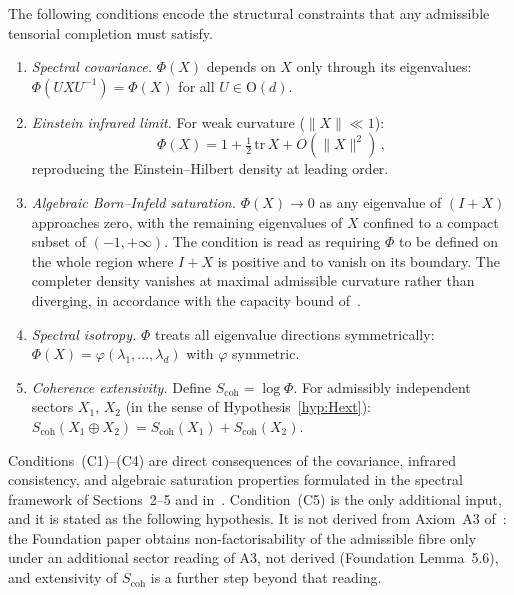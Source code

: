 \documentclass[pdflatex,sn-mathphys-num]{sn-jnl} %
\theoremstyle{remark}
\theoremstyle{plain}
\begin{document}
    The following conditions encode the structural constraints
    that any admissible tensorial completion must satisfy.

    \begin{enumerate}
      \item[\textbf{(C1)}]
      \textit{Spectral covariance.}\;
      $\Phi(X)$ depends on $X$ only through its eigenvalues:
      $\Phi(U X U^{-1}) = \Phi(X)$ for all
      $U \in \mathrm{O}(d)$.

      \item[\textbf{(C2)}]
      \textit{Einstein infrared limit.}\;
      For weak curvature ($\|X\| \ll 1$):
      \[
        \Phi(X)
        = 1 + \tfrac{1}{2}\,\mathrm{tr}\, X
        + O(\|X\|^2)\,,
      \]
      reproducing the Einstein--Hilbert density at
      leading order.

      \item[\textbf{(C3)}]
      \textit{Algebraic Born--Infeld saturation.}\;
      $\Phi(X) \to 0$ as any eigenvalue of $(I + X)$
      approaches zero, with the remaining eigenvalues of $X$
      confined to a compact subset of $(-1,+\infty)$.
      The condition is read as requiring $\Phi$ to be defined on the whole region where $I + X$ is positive and to
      vanish on its boundary.
      The completer density vanishes at maximal admissible
      curvature rather than diverging, in accordance with
      the capacity bound
      of~\cite{Beau2026c}.

      \item[\textbf{(C4)}]
      \textit{Spectral isotropy.}\;
      $\Phi$ treats all eigenvalue directions symmetrically:
      $\Phi(X) = \varphi(\lambda_1, \ldots, \lambda_d)$
      with $\varphi$ symmetric.

      \item[\textbf{(C5)}]
      \textit{Coherence extensivity.}\;
      Define $S_{\mathrm{coh}} = \log \Phi$.
      For admissibly independent sectors $X_1$, $X_2$
      (in the sense of Hypothesis~\ref{hyp:Hext}):
      $S_{\mathrm{coh}}(X_1 \oplus X_2)
      = S_{\mathrm{coh}}(X_1)
      + S_{\mathrm{coh}}(X_2)$.
    \end{enumerate}

    Conditions~(C1)--(C4) are direct consequences of the
    covariance, infrared consistency, and algebraic saturation
    properties formulated in the spectral framework of
    Sections~2--5 and in~\cite{Beau2026c}.
    Condition~(C5) is the only additional input, and it is stated as the following hypothesis.
    It is not derived from Axiom~A3 of~\cite{Beau2026m}: the Foundation paper obtains non-factorisability of the
    admissible fibre only under an additional sector reading of A3, not derived (Foundation Lemma~5.6), and
    extensivity of $S_{\mathrm{coh}}$ is a further step beyond that reading.
\end{document}
